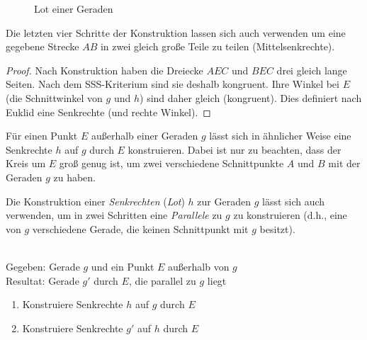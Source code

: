 
\begin{center}
    \begin{figure}[h]
        
        \caption{Lot einer Geraden}
    \end{figure}
\end{center}

Die letzten vier Schritte der Konstruktion lassen sich auch verwenden um eine gegebene Strecke $AB$
in zwei gleich große Teile zu teilen (Mittelsenkrechte).


\begin{proof}
    Nach Konstruktion haben die Dreiecke $AEC$ und $BEC$ drei gleich lange Seiten. Nach dem
    SSS-Kriterium sind sie deshalb kongruent. Ihre Winkel bei $E$ (die Schnittwinkel von $g$ und
    $h$) sind daher gleich (kongruent). Dies definiert nach Euklid eine Senkrechte (und rechte
    Winkel).
\end{proof}

Für einen Punkt $E$ außerhalb einer Geraden $g$ lässt sich in ähnlicher Weise eine Senkrechte $h$
auf $g$ durch $E$ konstruieren. Dabei ist nur zu beachten, dass der Kreis um $E$ groß genug ist, um
zwei verschiedene Schnittpunkte $A$ und $B$ mit der Geraden $g$ zu haben.

Die Konstruktion einer {\em Senkrechten} ({\em Lot}) $h$ zur Geraden $g$ lässt sich auch verwenden,
um in zwei Schritten eine {\em Parallele} zu $g$ zu konstruieren (d.h., eine von $g$ verschiedene
Gerade, die keinen Schnittpunkt mit $g$ besitzt).

\begin{konst}\ \\
    Gegeben: Gerade $g$ und ein Punkt $E$ außerhalb von $g$\\
    Resultat: Gerade $g'$ durch $E$, die parallel zu $g$ liegt
    \renewcommand{\labelenumi}{\arabic{enumi}.} %
    \begin{enumerate}
        \item Konstruiere Senkrechte $h$ auf $g$ durch $E$
        \item Konstruiere Senkrechte $g'$ auf $h$ durch $E$
    \end{enumerate}
\end{konst}

